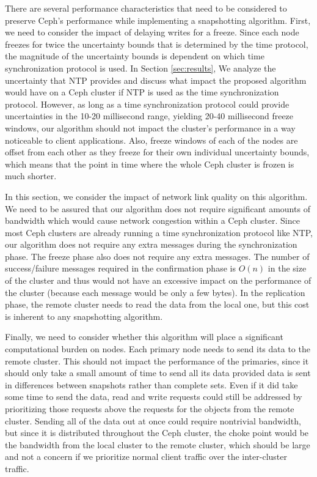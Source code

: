 There are several performance characteristics that need to be
considered to preserve Ceph's performance while implementing a
snapshotting algorithm. First, we need to consider the impact of
delaying writes for a freeze. Since each node freezes for twice the
uncertainty bounds that is determined by the time protocol, the magnitude of
the uncertainty bounds is dependent on which time synchronization protocol is
used. In Section \ref{sec:results}, We analyze the uncertainty that NTP
provides and discuss what impact the proposed algorithm would have on a Ceph
cluster if NTP is used as the time synchronization protocol. However,
as long as a time synchronization protocol could provide uncertainties
in the 10-20 millisecond range, yielding 20-40 millisecond freeze %
windows, our algorithm should not impact the cluster's performance in
a way noticeable to client applications. 
Also, freeze windows of each of the nodes are offset
from each other as they freeze for their own individual uncertainty bounds, 
which means that the point in time where the whole Ceph cluster is frozen
is much shorter.

In this section, we consider the impact of network link quality on 
this algorithm. We
need to be assured that our algorithm does not require significant
amounts of bandwidth which would cause network congestion within a
Ceph cluster. Since most Ceph clusters are already running a time
synchronization protocol like NTP, our algorithm does not require any
extra messages during the synchronization phase. The freeze phase also
does not require any extra messages. The number of success/failure
messages required in the confirmation phase is $O(n)$ in the size of
the cluster and thus would not have an excessive impact on the
performance of the cluster (because each message would be only a few
bytes). In the replication phase, the remote cluster needs to read
the data from the local one, but this cost is inherent to any
snapshotting algorithm.

Finally, we need to consider whether this algorithm will place a
significant computational burden on nodes. Each primary node needs to
send its data to the remote cluster. This should not impact the
performance of the primaries, since it should only take a small amount
of time to send all its data provided data is sent in differences
between snapshots rather than complete sets. Even if it did take some
time to send the data, read and write requests could still be
addressed by prioritizing those requests above the requests for the
objects from the remote cluster. Sending all of the data out at
once could require nontrivial bandwidth, but since it is distributed
throughout the Ceph cluster, the choke point would be the bandwidth
from the local cluster to the remote cluster, which should be large
and not a concern if we prioritize normal client traffic over the
inter-cluster traffic.

